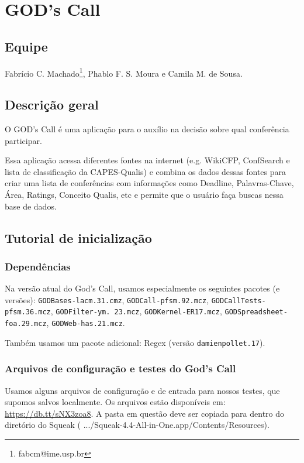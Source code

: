 \section{GOD's Call}
\subsection{Equipe}
	 Fabrício C. Machado\footnote{fabcm@ime.usp.br}, Phablo F. S. Moura e Camila M. de Sousa.

\subsection{Descrição geral}
  O GOD's Call é uma aplicação para o auxílio na decisão sobre qual conferência participar.
  
  Essa aplicação acessa diferentes fontes na internet (e.g. WikiCFP, ConfSearch e lista de classificação da CAPES-Qualis) e  combina os dados dessas fontes para criar uma lista de conferências com informações como Deadline, Palavras-Chave, Área, Ratings, Conceito Qualis, etc e permite que o usuário faça buscas nessa base de dados.

\subsection{Tutorial de inicialização} %

\subsubsection{Dependências}

Na versão atual do God's Call, usamos especialmente os seguintes pacotes (e versões):
\texttt{GODBases-lacm.31.cmz}, \texttt{GODCall-pfsm.92.mcz}, \texttt{GODCallTests-pfsm.36.mcz}, \texttt{GODFilter-ym. 23.mcz}, \texttt{GODKernel-ER17.mcz}, \texttt{GODSpreadsheet-foa.29.mcz}, \texttt{GODWeb-has.21.mcz}.

Também usamos um pacote adicional: Regex (versão \texttt{damienpollet.17}).

\subsubsection{Arquivos de configuração e testes do God's Call}

Usamos alguns arquivos de configuração e de entrada para nossos testes, que supomos salvos localmente. Os arquivos estão disponíveis em: \url{https://db.tt/sNX3zoa8}. A pasta em questão deve ser copiada para dentro do diretório do Squeak ( .../Squeak-4.4-All-in-One.app/Contents/Resources).

